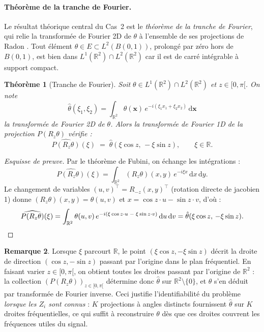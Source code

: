 \documentclass[12pt, a4paper]{article}
\newtheorem{theorem}{Théorème}[section]
\theoremstyle{definition}
\newtheorem{remark}[theorem]{Remarque}
\newcommand{\R}{\mathbb{R}}
\begin{document}
\paragraph{Théorème de la tranche de Fourier.}
Le résultat théorique central du Cas~2 est le \emph{théorème de la tranche de Fourier},
qui relie la transformée de Fourier 2D de $\theta$
à l'ensemble de ses projections de Radon \cite{natterer2001mathematics}.
Tout élément $\theta \in E \subset L^2(B(0,1))$, prolongé par zéro hors de $B(0,1)$,
est bien dans $L^1(\R^2) \cap L^2(\R^2)$ car il est de carré intégrable à support compact.

\begin{theorem}[Tranche de Fourier]
\label{thm:tranche_fourier}
Soit $\theta \in L^1(\R^2) \cap L^2(\R^2)$ et $z \in [0, \pi[$. On note
\[
  \hat\theta(\xi_1,\xi_2)
  = \int_{\R^2} \theta(\mathbf{x})\,e^{-i(\xi_1 x_1 + \xi_2 x_2)}\,\mathrm{d}\mathbf{x}
\]
la transformée de Fourier 2D de $\theta$. Alors la transformée
de Fourier 1D de la projection $P(R_z\theta)$ vérifie :
\[
  \widehat{P(R_z\theta)}(\xi)
  \;=\; \hat\theta(\xi\cos z,\,-\xi\sin z),
  \qquad \xi \in \R.
\]
\end{theorem}

\begin{proof}[Esquisse de preuve]
Par le théorème de Fubini, on échange les intégrations :
\[
  \widehat{P(R_z\theta)}(\xi)
  = \int_{\R^2} (R_z\theta)(x,y)\,e^{-i\xi x}\,\mathrm{d}x\,\mathrm{d}y.
\]
Le changement de variables $(u,v)^\top = R_{-z}(x,y)^\top$ (rotation directe de jacobien 1)
donne $(R_z\theta)(x,y) = \theta(u,v)$ et $x = \cos z \cdot u - \sin z \cdot v$, d'où :
\[
  \widehat{P(R_z\theta)}(\xi)
  = \int_{\R^2} \theta(u,v)\,
    e^{-i(\xi\cos z \cdot u\;-\;\xi\sin z \cdot v)}\,\mathrm{d}u\,\mathrm{d}v
  = \hat\theta(\xi\cos z,\,-\xi\sin z). \qedhere
\]
\end{proof}

\begin{remark}
Lorsque $\xi$ parcourt $\R$, le point $(\xi\cos z, -\xi\sin z)$ décrit la droite
de direction $(\cos z, -\sin z)$ passant par l'origine dans le plan fréquentiel.
En faisant varier $z \in [0, \pi[$, on obtient toutes les droites passant par
l'origine de $\R^2$ : la collection $(P(R_z\theta))_{z \in [0,\pi[}$ détermine donc
$\hat\theta$ sur $\R^2 \setminus \{0\}$, et $\theta$ s'en déduit par transformée
de Fourier inverse. Ceci justifie l'identifiabilité du problème \emph{lorsque les
$Z_i$ sont connus} : $K$ projections à angles distincts fournissent $\hat\theta$
sur $K$ droites fréquentielles, ce qui suffit à reconstruire $\theta$ dès que ces
droites couvrent les fréquences utiles du signal.
\end{remark}
\end{document}
